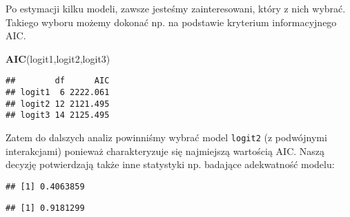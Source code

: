 \documentclass[polish,]{book}
\newenvironment{Shaded}{\begin{snugshade}}{\end{snugshade}}
\newcommand{\DecValTok}[1]{\textcolor[rgb]{0.00,0.00,0.81}{#1}}
\newcommand{\KeywordTok}[1]{\textcolor[rgb]{0.13,0.29,0.53}{\textbf{#1}}}
\newcommand{\NormalTok}[1]{#1}
\newcommand{\OperatorTok}[1]{\textcolor[rgb]{0.81,0.36,0.00}{\textbf{#1}}}
\begin{document}
Po estymacji kilku modeli, zawsze jesteśmy zainteresowani, który z nich wybrać.
Takiego wyboru możemy dokonać np. na podstawie kryterium informacyjnego AIC.

\begin{Shaded}
\begin{Highlighting}[]
\KeywordTok{AIC}\NormalTok{(logit1,logit2,logit3)}
\end{Highlighting}
\end{Shaded}

\begin{verbatim}
##        df      AIC
## logit1  6 2222.061
## logit2 12 2121.495
## logit3 14 2125.495
\end{verbatim}

Zatem do dalszych analiz powinniśmy wybrać model \texttt{logit2} (z podwójnymi interakcjami) ponieważ charakteryzuje się najmiejszą wartością AIC. Naszą decyzję
potwierdzają także inne statystyki np. badające adekwatność modelu:

\begin{Shaded}
\end{Shaded}

\begin{verbatim}
## [1] 0.4063859
\end{verbatim}

\begin{Shaded}
\end{Shaded}

\begin{verbatim}
## [1] 0.9181299
\end{verbatim}

\begin{Shaded}
\end{Shaded}
\end{document}
